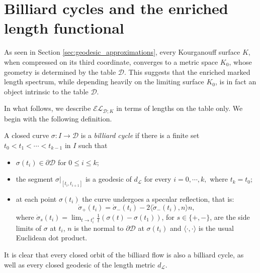 \documentclass[reqno,11pt]{amsart}
\begin{document}
\section{Billiard cycles and the enriched length functional}\label{sec_billiards_cycles_lf}
\par As seen in Section \ref{sec:geodesic_approximations}, every Kourganouff surface \(K\), when compressed on its third coordinate, converges to a metric space \(K_0\), whose geometry is determined by the table \(\mathcal{D}\).
This suggests that the enriched marked length spectrum, while depending heavily on the limiting surface \(K_0\), is in fact an object intrinsic to the table \( \mathcal{D} \).
\par In what follows, we describe \( \mathcal{EL}_{\mathcal{D}; K} \) in terms of lengths on the table only.
We begin with the following definition.
\begin{defi}
    A closed curve \( \sigma\colon I \to \mathcal{D} \) is a \emph{billiard cycle} if there is a finite set \( t_0 < t_1 < \cdots < t_{k-1} \) in \( I \) such that
    \begin{itemize}
        \item[(i)] \( \sigma(t_i) \in \partial\mathcal{D} \) for \( 0 \leq i \leq k \);
        \item[(ii)] the segment \( \sigma\rvert_{[t_i, t_{i+1}]} \) is a geodesic of \( d_\mathcal{L} \) for every \( i = 0, \cdots, k, \) where \( t_k = t_0 \);
        \item[(iii)] at each point \( \sigma(t_i) \) the curve undergoes a specular reflection, that is:
        \[
            \dot\sigma_+(t_i) = \dot\sigma_-(t_i) - 2\langle \dot\sigma_-(t_i), n\rangle n,
        \]
        where 
        \( \dot\sigma_s(t_i) = \lim_{t \to t_i^s}\frac{1}{t}(\sigma(t) - \sigma(t_1))\), for \( s\in \{+ , -\} \),
        are the side limits of \(\sigma\) at \(t_i\), \(n\) is the normal to \( \partial\mathcal{D} \) at \(\sigma(t_i)\) and \( \langle \cdot, \cdot \rangle\) is the usual Euclidean dot product.
    \end{itemize}     
\end{defi}
It is clear that every closed orbit of the billiard flow is also a billiard cycle, as well as every closed geodesic of the length metric \( d_\mathcal{L} \).  
\end{document}
